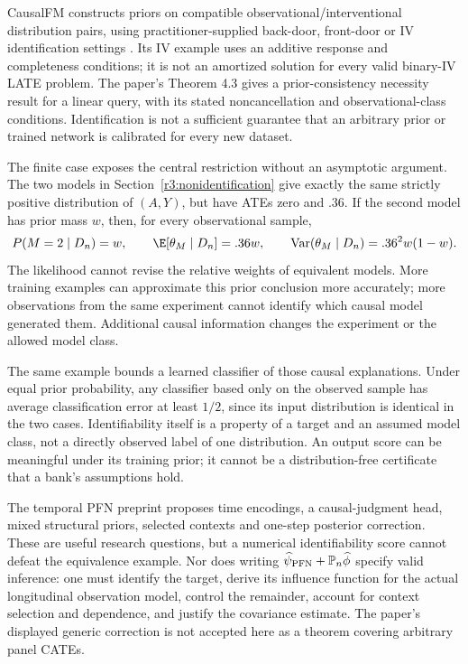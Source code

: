 CausalFM constructs priors on compatible observational/interventional
distribution pairs, using practitioner-supplied back-door, front-door or
IV identification settings \citep[Definitions 3.1 and 4.2]{causalpfn2026}.
Its IV example uses an additive response and completeness conditions;
it is not an amortized solution for every valid binary-IV LATE problem.
The paper's Theorem 4.3 gives a prior-consistency necessity result for
a linear query, with its stated noncancellation and observational-class
conditions. Identification is not a sufficient guarantee that an arbitrary
prior or trained network is calibrated for every new dataset.

The finite case exposes the central restriction without an asymptotic
argument. The two models in Section~\ref{r3:nonidentification} give exactly
the same strictly positive distribution of $(A,Y)$, but have ATEs zero
and $.36$. If the second model has prior mass $w$, then, for every
observational sample,
\[
 P(M=2\mid D_n)=w,\qquad
 \E[\theta_M\mid D_n]=.36w,\qquad
 \operatorname{Var}(\theta_M\mid D_n)=.36^2w(1-w).
\]
The likelihood cannot revise the relative weights of equivalent models.
More training examples can approximate this prior conclusion more
accurately; more observations from the same experiment cannot identify
which causal model generated them. Additional causal information changes
the experiment or the allowed model class.

The same example bounds a learned classifier of those causal explanations.
Under equal prior probability, any classifier based only on the observed
sample has average classification error at least $1/2$, since its input
distribution is identical in the two cases. Identifiability itself is a
property of a target and an assumed model class, not a directly observed
label of one distribution. An output score can be meaningful under its
training prior; it cannot be a distribution-free certificate that a
bank's assumptions hold.

The temporal PFN preprint \citet[Sections 3.2--3.6]{panelpfn2026} proposes
time encodings, a causal-judgment head, mixed structural priors, selected
contexts and one-step posterior correction. These are useful research
questions, but a numerical identifiability score cannot defeat the
equivalence example. Nor does writing
$\widehat\psi_{\rm PFN}+\mathbb P_n\widehat\phi$
specify valid inference: one must identify the target, derive its
influence function for the actual longitudinal observation model, control
the remainder, account for context selection and dependence, and justify
the covariance estimate. The paper's displayed generic correction is
not accepted here as a theorem covering arbitrary panel CATEs.

